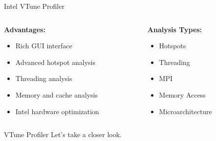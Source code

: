 \begin{frame}{Intel VTune Profiler}
    \begin{columns}
        \begin{column}{0.6\textwidth}
            \textbf{Advantages:}
            \begin{itemize}
                \item Rich GUI interface
                \item Advanced hotspot analysis
                \item Threading analysis
                \item Memory and cache analysis
                \item Intel hardware optimization
            \end{itemize}
        \end{column}
        \begin{column}{0.4\textwidth}
            \textbf{Analysis Types:}
            \begin{itemize}
                \item Hotspots
                \item Threading
                \item MPI
                \item Memory Access
                \item Microarchitecture
            \end{itemize}
        \end{column}
    \end{columns}
\end{frame}

\begin{frame}{VTune Profiler}
    Let's take a closer look.
\end{frame}